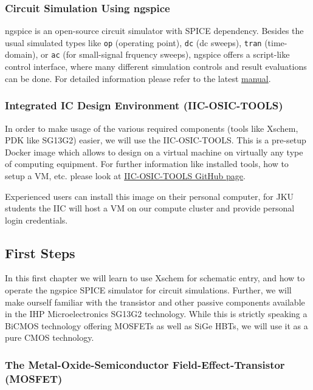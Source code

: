 \documentclass[
  letterpaper,
  DIV=11,
  numbers=noendperiod]{scrartcl}
\begin{document}
\subsubsection{Circuit Simulation Using
ngspice}\label{circuit-simulation-using-ngspice}

ngspice is an open-source circuit simulator with SPICE dependency.
Besides the usual simulated types like \texttt{op} (operating point),
\texttt{dc} (dc sweeps), \texttt{tran} (time-domain), or \texttt{ac}
(for small-signal frquency sweeps), ngspice offers a script-like control
interface, where many different simulation controls and result
evaluations can be done. For detailed information please refer to the
latest
\href{https://ngspice.sourceforge.io/docs/ngspice-43-manual.pdf}{manual}.

\subsubsection{Integrated IC Design Environment
(IIC-OSIC-TOOLS)}\label{integrated-ic-design-environment-iic-osic-tools}

In order to make usage of the various required components (tools like
Xschem, PDK like SG13G2) easier, we will use the IIC-OSIC-TOOLS. This is
a pre-setup Docker image which allows to design on a virtual machine on
virtually any type of computing equipment. For further information like
installed tools, how to setup a VM, etc. please look at
\href{https://github.com/iic-jku/IIC-OSIC-TOOLS}{IIC-OSIC-TOOLS GitHub
page}.

Experienced users can install this image on their personal computer, for
JKU students the IIC will host a VM on our compute cluster and provide
personal login credentials.

\subsection{First Steps}\label{first-steps}

In this first chapter we will learn to use Xschem for schematic entry,
and how to operate the ngspice SPICE simulator for circuit simulations.
Further, we will make ourself familiar with the transistor and other
passive components available in the IHP Microelectronics SG13G2
technology. While this is strictly speaking a BiCMOS technology offering
MOSFETs as well as SiGe HBTs, we will use it as a pure CMOS technology.

\subsubsection{The Metal-Oxide-Semiconductor Field-Effect-Transistor
(MOSFET)}\label{sec-mosfet}
\end{document}
